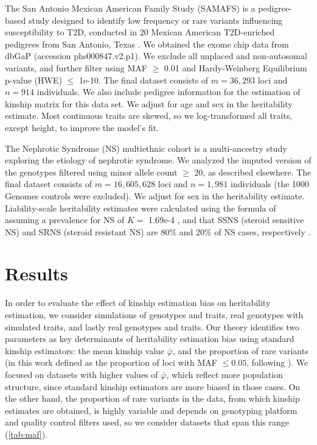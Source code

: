 \documentclass[11pt]{article}
\begin{document}
The San Antonio Mexican American Family Study (SAMAFS) is a pedigree-based study designed to identify low frequency or rare variants influencing susceptibility to T2D, conducted in 20 Mexican American T2D-enriched pedigrees from San Antonio, Texas  \citep{mitchell1996genetic}. We obtained the exome chip data from dbGaP (accession phs000847.v2.p1). We exclude all unplaced and non-autosomal variants, and further filter using MAF $\ge$ 0.01 and Hardy-Weinberg Equilibrium p-value (HWE) $\le$ 1e-10. The final dataset consists of $m=36,293$ loci and $n=914 $ individuals. We also include pedigree information for the estimation of kinship matrix for this data set. We adjust for age and sex in the heritability estimate. Most continuous traits are skewed, so we log-transformed all traits, except height, to improve the model's fit.

The Nephrotic Syndrome (NS) multiethnic cohort is a multi-ancestry study exploring the etiology of nephrotic syndrome. We analyzed the imputed version of the genotypes filtered using minor allele count $\ge$ 20, as described elsewhere. The final dataset consists of $m=16,605,628$ loci and $n=1,981$ individuals (the 1000 Genomes controls were excluded). We adjust for sex in the heritability estimate.
Liability-scale heritability estimates were calculated using the formula of \citet{lee_estimating_2011} assuming a prevalence for NS of $K =$ 1.69e-4 \citep{gbadegesin2015hla,jia2020common,barry2023multi}, and that SSNS (steroid sensitive NS) and SRNS (steroid resistant NS) are 80\% and 20\% of NS cases, respectively \citep{gbadegesin2015hla,jia2018strong}.

\section{Results}

In order to evaluate the effect of kinship estimation bias on heritability estimation, we consider simulations of genotypes and traits, real genotypes with simulated traits, and lastly real genotypes and traits.
Our theory identifies two parameters as key determinants of heritability estimation bias using standard kinship estimators: the mean kinship value $\bar{\varphi}$, and the proportion of rare variants (in this work defined as the proportion of loci with MAF $\le 0.05$, following \citet{biddanda2020variant}).
We focused on datasets with higher values of $\bar{\varphi}$, which reflect more population structure, since standard kinship estimators are more biased in those cases.
On the other hand, the proportion of rare variants in the data, from which kinship estimates are obtained, is highly variable and depends on genotyping platform and quality control filters used, so we consider datasets that span this range (\cref{tab:maf}).
\end{document}
